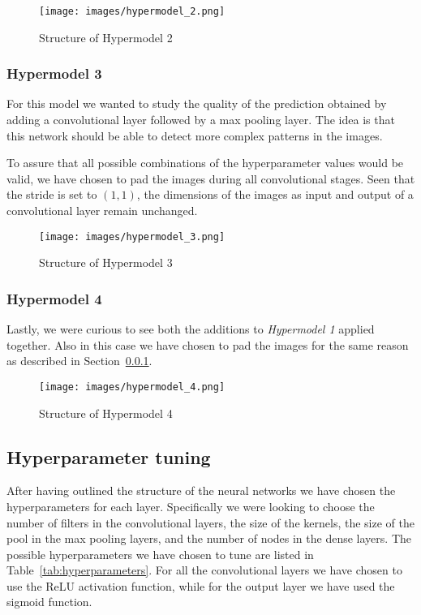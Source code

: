 \begin{figure}[h]
    \label{fig:Hypermodel_2}
    \centering
    \texttt{[image: images/hypermodel\_2.png]}
    \caption{Structure of Hypermodel 2}
\end{figure}

\subsubsection{Hypermodel 3}\label{hypermodel_3}
For this model we wanted to study the quality of the prediction obtained by adding a convolutional layer followed by a max pooling layer. The idea is that this network should be able to detect more complex patterns in the images.

To assure that all possible combinations of the hyperparameter values would be valid, we have chosen to pad the images during all convolutional stages. Seen that the stride is set to $(1,1)$, the dimensions of the images as input and output of a convolutional layer remain unchanged.

\begin{figure}[!]
    \label{fig:Hypermodel_3}
    \centering
    \texttt{[image: images/hypermodel\_3.png]}
    \caption{Structure of Hypermodel 3}
\end{figure}

\subsubsection{Hypermodel 4}\label{hypermodel_4}
Lastly, we were curious to see both the additions to \textsl{Hypermodel 1} applied together.
Also in this case we have chosen to pad the images for the same reason as described in Section~\ref{hypermodel_3}.

\begin{figure}[!]
    \label{fig:Hypermodel_4}
    \centering
    \texttt{[image: images/hypermodel\_4.png]}
    \caption{Structure of Hypermodel 4}
\end{figure}

\subsection{Hyperparameter tuning}\label{hyperparameter_tuning}
After having outlined the structure of the neural networks we have chosen the hyperparameters for each layer. Specifically we were looking to choose the number of filters in the convolutional layers, the size of the kernels, the size of the pool in the max pooling layers, and the number of nodes in the dense layers. The possible hyperparameters we have chosen to tune are listed in Table~\ref{tab:hyperparameters}. For all the convolutional layers we have chosen to use the ReLU activation function, while for the output layer we have used the sigmoid function. 


